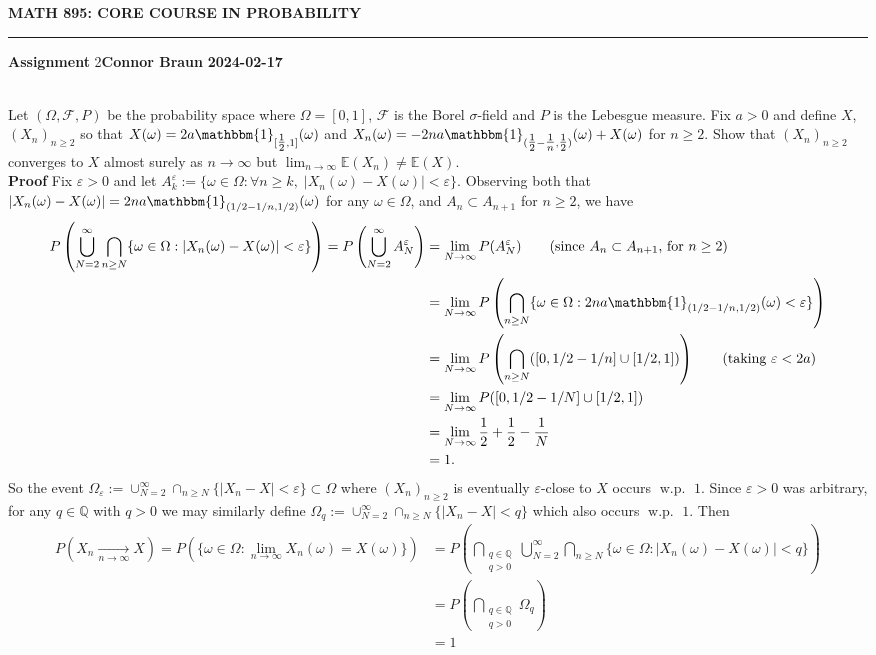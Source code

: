 \documentclass[10pt]{article}
\newcommand{\E}{\mathbb{E}}
\newcommand{\bp}[1]{\left({#1}\right)}
\newcommand{\mbb}[1]{\mathbb{#1}}
\newcommand{\1}[1]{\mathbbm{1}_{#1}}
\newcommand{\mc}[1]{\mathcal{#1}}
\DeclareMathOperator{\wip}{w.p.}
\begin{document}
    \begin{center}
        {\bf\large{MATH 895: CORE COURSE IN PROBABILITY}}
        \smallskip
        \hrule
        \smallskip
        {\bf Assignment} 2\hfill {\bf Connor Braun} \hfill {\bf 2024-02-17}
    \end{center}
    \\[5pt]
    Let $(\Omega,\mc{F},P)$ be the probability space where $\Omega=[0,1]$, $\mc{F}$ is the Borel $\sigma$-field and $P$ is the Lebesgue measure. Fix $a>0$ and define
    $X$, $(X_n)_{n\geq 2}$ so that $X(\omega)=2a\1{[\tfrac{1}{2},1]}(\omega)$ and $X_n(\omega)=-2na\1{(\tfrac{1}{2}-\tfrac{1}{n},\tfrac{1}{2})}(\omega)+X(\omega)$ for $n\geq 2$.
    Show that $(X_n)_{n\geq 2}$ converges to $X$ almost surely as $n\rightarrow\infty$ but $\lim_{n\rightarrow\infty}\E(X_n)\neq \E(X)$.\\[5pt]
    {\bf Proof}\hspace{5pt} Fix $\varepsilon>0$ and let $A^\varepsilon_k:=\{\omega\in\Omega:\forall n\geq k,\;|X_n(\omega)-X(\omega)|<\varepsilon\}$. Observing both that $|X_n(\omega)-X(\omega)|=2na\1{(1/2-1/n,1/2)}(\omega)$ for any $\omega\in\Omega$, and $A_n\subset A_{n+1}$ for $n\geq 2$, we have
    \begin{align*}
        P\bp{\bigcup_{N=2}^\infty\bigcap_{n\geq N}\{\omega\in\Omega:|X_n(\omega)-X(\omega)|<\varepsilon\}}=P\bp{\bigcup_{N=2}^\infty A_N^\varepsilon}&=\lim_{N\rightarrow\infty}P(A_N^\varepsilon)\tag{since $A_n\subset A_{n+1}$, for $n\geq 2$}\\
        &=\lim_{N\rightarrow\infty}P\bp{\bigcap_{n\geq N}\{\omega\in\Omega:2na\1{(1/2-1/n,1/2)}(\omega)<\varepsilon\}}\\
        &=\lim_{N\rightarrow\infty}P\bp{\bigcap_{n\geq N}([0,1/2-1/n]\cup[1/2,1])}\tag{taking $\varepsilon<2a$}\\
        &=\lim_{N\rightarrow\infty}P([0,1/2-1/N]\cup[1/2,1])\\
        &=\lim_{N\rightarrow\infty}\frac{1}{2}+\frac{1}{2}-\frac{1}{N}\\
        &=1.
    \end{align*}
    So the event $\Omega_\varepsilon:=\cup_{N=2}^\infty\cap_{n\geq N}\{|X_n-X|<\varepsilon\}\subset\Omega$ where $(X_n)_{n\geq 2}$ is eventually $\varepsilon$-close to $X$ occurs $\wip$ $1$. Since $\varepsilon>0$ was arbitrary, for any $q\in\mbb{Q}$ with $q>0$
    we may similarly define $\Omega_q:=\cup_{N=2}^\infty\cap_{n\geq N}\{|X_n-X|<q\}$ which also occurs $\wip$ $1$. Then
    \begin{align*}
        P\bp{X_n\underset{n\rightarrow\infty}{\longrightarrow}X}=P\bp{\{\omega\in\Omega:\lim_{n\rightarrow\infty}X_n(\omega)=X(\omega)\}}&=P\bp{\bigcap_{\substack{q\in\mbb{Q} \\ q>0}}\bigcup_{N=2}^\infty\bigcap_{n\geq N}\{\omega\in\Omega:|X_n(\omega)-X(\omega)|<q\}}\\
        &=P\bp{\bigcap_{\substack{q\in\mbb{Q} \\ q>0}}\Omega_q}\\
        &=1
    \end{align*}
\end{document}
